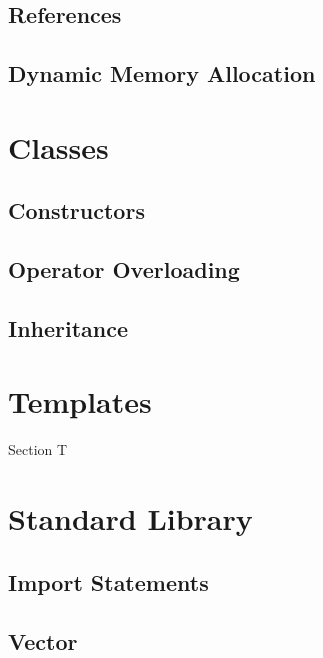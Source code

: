 \documentclass{article}
\begin{document}
  \subsection{References}
  \subsection{Dynamic Memory Allocation} 


\section{Classes}
  \subsection{Constructors}
  \subsection{Operator Overloading}
  \subsection{Inheritance}

\section{Templates}
  Section T

\section{Standard Library}
  \subsection{Import Statements}
  \subsection{Vector}
\end{document}
